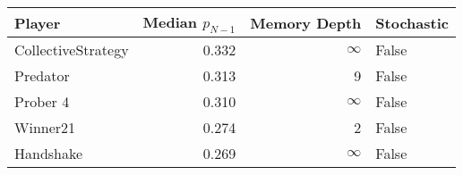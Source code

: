 \begin{tabular}{lrrl}
\toprule
             Player &  Median $p_{N-1}$ &  Memory Depth & Stochastic \\
\midrule
 CollectiveStrategy &             0.332 &            \(\infty\) &      False \\
           Predator &             0.313 &             9 &      False \\
           Prober 4 &             0.310 &            \(\infty\) &      False \\
           Winner21 &             0.274 &             2 &      False \\
          Handshake &             0.269 &            \(\infty\) &      False \\
\bottomrule
\end{tabular}
